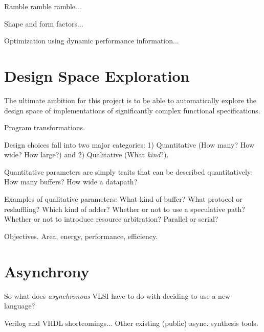 Ramble ramble ramble...

Shape and form factors...

Optimization using dynamic performance information...

\section{Design Space Exploration}
\label{sec:goals:explore}

The ultimate ambition for this project is to be able to 
automatically explore the design space of implementations of
significantly complex functional specifications.  

Program transformations.  

Design choices fall into two major categories:
1) Quantitative (How many?  How wide?  How large?) and
2) Qualitative (What \emph{kind}?).  

Quantitative parameters are simply traits that can be described
quantitatively:  How many buffers?  How wide a datapath?  

Examples of qualitative parameters:
What kind of buffer?  What protocol or reshuffling?  
Which kind of adder?  Whether or not to use a speculative path?
Whether or not to introduce resource arbitration?
Parallel or serial?

Objectives.
Area, energy, performance, efficiency.  

\section{Asynchrony}
\label{sec:goals:async}

So what does \emph{asynchronous} VLSI have to do with deciding
to use a new language?  

Verilog and VHDL shortcomings...
Other existing (public) async. synthesis tools.  


